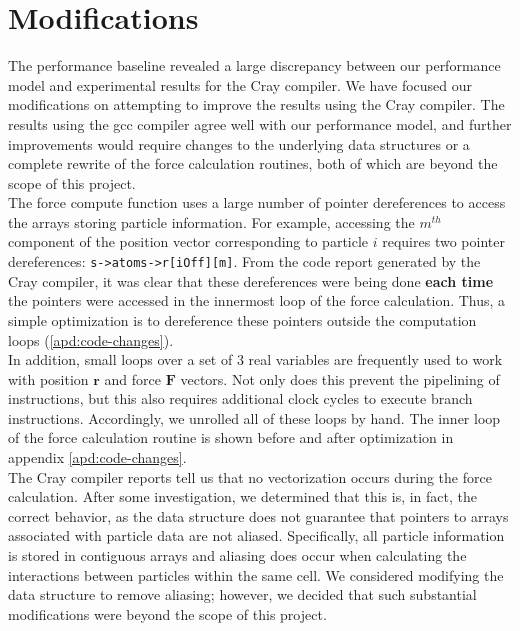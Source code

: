\documentclass[12pt]{article}
\begin{document}

\section{Modifications}
\label{sec:mods}
The performance baseline revealed a large discrepancy between our
performance model and experimental results for the Cray compiler. We
have focused our modifications on attempting to improve the results
using the Cray compiler. The results using the gcc compiler agree well
with our performance model, and further improvements would require
changes to the underlying data structures or a complete rewrite of the
force calculation routines, both of which are beyond the scope of this
project. \\

\noindent The force compute function uses a large number of pointer dereferences
to access the arrays storing particle information. For example, accessing the $m^{th}$ 
component of the position vector corresponding to particle $i$ requires two pointer 
dereferences: \texttt{s->atoms->r[iOff][m]}. From the code report generated by the Cray 
compiler, it was clear that these dereferences were being done {\bf each time} the
pointers were accessed in the innermost loop of the force calculation. 
Thus, a simple optimization is to dereference these pointers outside the computation 
loops (\ref{apd:code-changes}). \\

\noindent In addition, small loops over a set of 3 real variables are frequently used to
work with position $\bm{r}$ and force $\textbf{F}$ vectors. Not only does this prevent the pipelining
of instructions, but this also requires additional clock cycles to execute branch instructions.
Accordingly, we unrolled all of these loops by hand. The inner loop of the force calculation 
routine is shown before and after optimization in appendix \ref{apd:code-changes}. \\

\noindent The Cray compiler reports tell us that no vectorization occurs
during the force calculation. After some investigation, we determined that 
this is, in fact, the correct behavior, as the data structure does not
guarantee that pointers to arrays associated with particle data are not aliased. 
Specifically, all particle information is stored in contiguous arrays and aliasing does occur
when calculating the interactions between particles within the same cell. We
considered modifying the data structure to remove aliasing; however, we decided 
that such substantial modifications were beyond the scope of this project. \\
\end{document}
